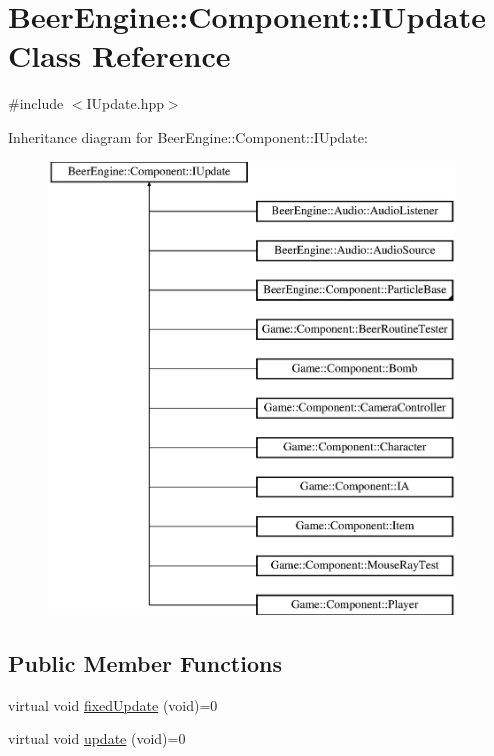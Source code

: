 \hypertarget{class_beer_engine_1_1_component_1_1_i_update}{}\section{Beer\+Engine\+:\+:Component\+:\+:I\+Update Class Reference}
\label{class_beer_engine_1_1_component_1_1_i_update}


{\ttfamily \#include $<$I\+Update.\+hpp$>$}

Inheritance diagram for Beer\+Engine\+:\+:Component\+:\+:I\+Update\+:\begin{figure}[H]
\begin{center}
\leavevmode
\includegraphics[height=12.000000cm]{class_beer_engine_1_1_component_1_1_i_update}
\end{center}
\end{figure}
\subsection*{Public Member Functions}
\begin{DoxyCompactItemize}
\item 
virtual void \mbox{\hyperlink{class_beer_engine_1_1_component_1_1_i_update_a615c127a4729f73713e5eaeee538854b}{fixed\+Update}} (void)=0
\item 
virtual void \mbox{\hyperlink{class_beer_engine_1_1_component_1_1_i_update_aeeda0aa303175720e449b4c51d9867dd}{update}} (void)=0
\end{DoxyCompactItemize}


